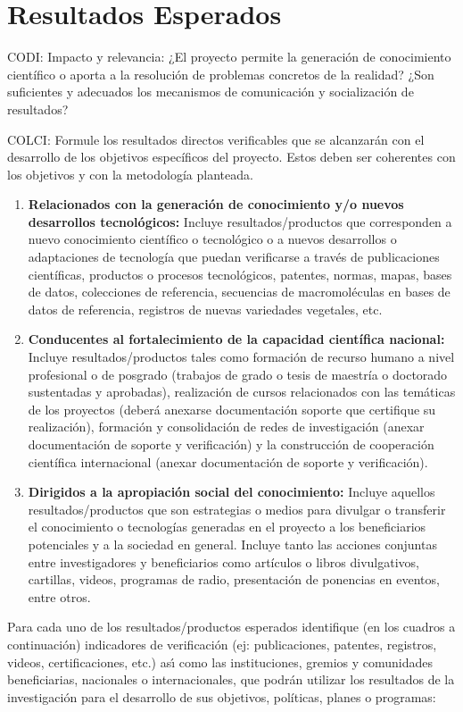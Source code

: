 \section{ Resultados Esperados }
\begin{instrucciones}
CODI:  Impacto y relevancia:
¿El proyecto permite la generación de conocimiento científico o aporta a la resolución de problemas concretos de la realidad? ¿Son suficientes y adecuados los mecanismos de comunicación y socialización de resultados? 

 COLCI: Formule los resultados directos verificables que se
alcanzarán con el desarrollo de los objetivos específicos del proyecto. Estos deben ser coherentes
con los objetivos y con la metodología planteada.



  \begin{enumerate}
  \item \textbf{Relacionados con la generación de conocimiento y/o nuevos desarrollos
 tecnológicos:} Incluye resultados/productos que corresponden a nuevo
 conocimiento científico o tecnológico o a nuevos desarrollos o adaptaciones de
 tecnología que puedan verificarse a través de publicaciones científicas,
 productos o procesos tecnológicos, patentes, normas, mapas, bases de datos,
 colecciones de referencia, secuencias de macromoléculas en bases de datos de
 referencia, registros de nuevas variedades vegetales, etc.
\item \textbf{Conducentes al fortalecimiento de la capacidad científica
  nacional:} Incluye resultados/productos tales como formación de
  recurso humano a nivel profesional o de posgrado (trabajos de grado
  o tesis de maestría o doctorado sustentadas y aprobadas),
  realización de cursos relacionados con las temáticas de los
  proyectos (deberá anexarse documentación soporte que certifique su
  realización), formación y consolidación de redes de investigación
  (anexar documentación de soporte y verificación) y la construcción
  de cooperación científica internacional (anexar documentación de
  soporte y verificación).
\item \textbf{Dirigidos a la apropiación social del conocimiento:}
  Incluye aquellos resultados/productos que son estrategias o medios
  para divulgar o transferir el conocimiento o tecnologías generadas
  en el proyecto a los beneficiarios potenciales y a la sociedad en
  general. Incluye tanto las acciones conjuntas entre investigadores y
  beneficiarios como artículos o libros divulgativos, cartillas,
  videos, programas de radio, presentación de ponencias en eventos,
  entre otros.
  \end{enumerate}

  Para cada uno de los resultados/productos esperados identifique (en
  los cuadros a continuación) indicadores de verificación (ej:
  publicaciones, patentes, registros, videos, certificaciones, etc.)
  as\'\i{} como las instituciones, gremios y comunidades beneficiarias,
  nacionales o internacionales, que podrán utilizar los resultados de
  la investigación para el desarrollo de sus objetivos, políticas,
  planes o programas:

\end{instrucciones}

